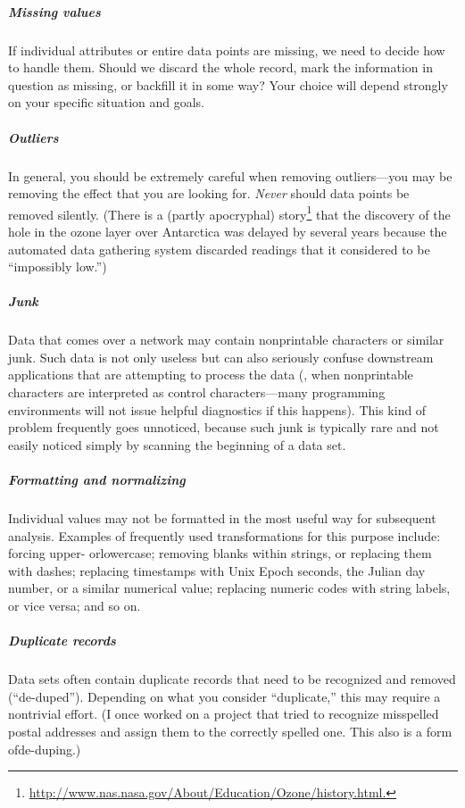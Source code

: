 \begin{unnumlist}
\subparagraph{Missing values}
\item If individual attributes or entire data points  
  are missing, we need to decide how to handle them. Should we discard
  the whole record, mark the information in question as missing, or
  backfill it in some way?  Your choice will depend strongly on your
  specific situation and goals.

\subparagraph{Outliers}
\item In general, you should be extremely careful when  
  removing outliers---you may be removing the effect that you are
  looking for. \emph{Never} should data points be removed silently.
  (There is a (partly apocryphal) 
  story\footnote{\url{http://www.nas.nasa.gov/About/Education/Ozone/history.html.}}
  that the discovery of the hole in the ozone layer over Antarctica
  was delayed by several years because the automated data gathering
  system discarded readings that it considered to be ``impossibly
  low.'')

\subparagraph{Junk}
\item Data that comes over a network may contain nonprintable
  characters or similar junk. Such data is not only useless but can
  also seriously confuse downstream applications that are attempting
  to process the data (\eg, when nonprintable characters are
  interpreted as control characters---many programming environments
  will not issue helpful diagnostics if this happens).  This kind of
  problem frequently goes unnoticed, because such junk is typically
  rare and not easily noticed simply by scanning the beginning of a
  data set.
  
\subparagraph{Formatting and normalizing}  
\item Individual values may not be
  formatted in the most useful way for subsequent analysis. Examples
  of frequently used transformations\vadjust{\pagebreak} for this purpose include: forcing
  upper- or\break lowercase; removing blanks within  strings, or replacing
  them with dashes; replacing timestamps with Unix Epoch seconds, the
  Julian day number, or a similar numerical value; replacing numeric
  codes with string labels, or vice versa; and so on.

\subparagraph{Duplicate records}
\item Data sets often contain duplicate records  
  that need to be recognized and removed (``de-duped'').  Depending on
  what you consider ``duplicate,'' this may require a nontrivial
  effort.  (I once worked on a project that tried to recognize
  misspelled postal addresses and assign them to the correctly spelled
  one.  This also is a form of\break de-duping.)


\end{unnumlist}
